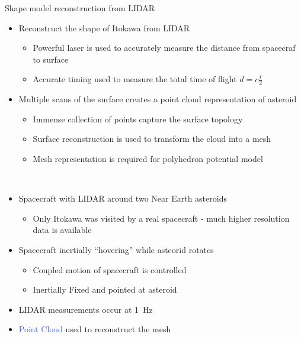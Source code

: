 \documentclass[final, usenames, dvipsnames]{beamer}
\newlength{\twocolwidth}
\def\Emph{\textcolor{RoyalBlue}}
\begin{document}
\begin{frame}[t]
\begin{columns}[T,onlytextwidth]
\begin{column}{\twocolwidth}
\begin{block}{Shape model reconstruction from LIDAR} %
    \begin{minipage}[t]{0.5\columnwidth}
    \begin{itemize}
        \item Reconstruct the shape of Itokawa from LIDAR
            \begin{itemize}
                \item Powerful laser is used to accurately measure the distance from spacecraf to surface
                \item Accurate timing used to measure the total time of flight \( d = c \frac{t}{2} \)
            \end{itemize}
        \item Multiple scans of the surface creates a point cloud representation of asteroid
        \begin{itemize}
            \item Immense collection of points capture the surface topology
            \item Surface reconstruction is used to transform the cloud into a mesh 
            \item Mesh representation is required for polyhedron potential model
        \end{itemize}
    \end{itemize}
    \end{minipage}~
    \begin{minipage}[t]{0.48\columnwidth}
    \begin{itemize}
        \item Spacecraft with LIDAR around two Near Earth asteroids
            \begin{itemize}
                \item Only Itokawa was visited by a real spacecraft - much higher resolution data is available
            \end{itemize}
        \item Spacecraft inertially ``hovering'' while asteorid rotates 
            \begin{itemize}
                \item Coupled motion of spacecraft is controlled 
                \item Inertially Fixed and pointed at asteroid
            \end{itemize}
        \item LIDAR measurements occur at \SI{1}{\hertz} 
        \item \Emph{Point Cloud} used to reconstruct the mesh

\end{itemize}
\end{minipage}
\end{block}
\end{column}
\end{columns}
\end{frame}
\end{document}
